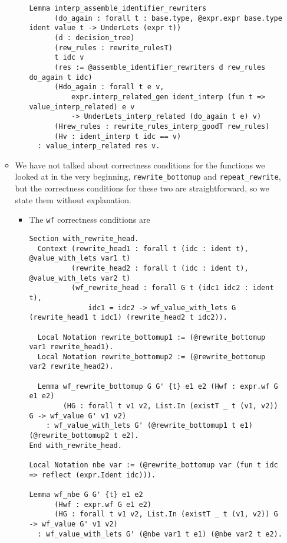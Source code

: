 \documentclass[
]{article}
\begin{document}
\begin{itemize}
\begin{itemize}
\begin{itemize}
\begin{verbatim}
Lemma interp_assemble_identifier_rewriters
      (do_again : forall t : base.type, @expr.expr base.type ident value t -> UnderLets (expr t))
      (d : decision_tree)
      (rew_rules : rewrite_rulesT)
      t idc v
      (res := @assemble_identifier_rewriters d rew_rules do_again t idc)
      (Hdo_again : forall t e v,
          expr.interp_related_gen ident_interp (fun t => value_interp_related) e v
          -> UnderLets_interp_related (do_again t e) v)
      (Hrew_rules : rewrite_rules_interp_goodT rew_rules)
      (Hv : ident_interp t idc == v)
  : value_interp_related res v.
\end{verbatim}
    \end{itemize}
  \item
    We have not talked about correctness conditions for the functions we
    looked at in the very beginning, \texttt{rewrite\_bottomup} and
    \texttt{repeat\_rewrite}, but the correctness conditions for these
    two are straightforward, so we state them without explanation.

    \begin{itemize}
    \item
      The \texttt{wf} correctness conditions are

\begin{verbatim}
Section with_rewrite_head.
  Context (rewrite_head1 : forall t (idc : ident t), @value_with_lets var1 t)
          (rewrite_head2 : forall t (idc : ident t), @value_with_lets var2 t)
          (wf_rewrite_head : forall G t (idc1 idc2 : ident t),
              idc1 = idc2 -> wf_value_with_lets G (rewrite_head1 t idc1) (rewrite_head2 t idc2)).

  Local Notation rewrite_bottomup1 := (@rewrite_bottomup var1 rewrite_head1).
  Local Notation rewrite_bottomup2 := (@rewrite_bottomup var2 rewrite_head2).

  Lemma wf_rewrite_bottomup G G' {t} e1 e2 (Hwf : expr.wf G e1 e2)
        (HG : forall t v1 v2, List.In (existT _ t (v1, v2)) G -> wf_value G' v1 v2)
    : wf_value_with_lets G' (@rewrite_bottomup1 t e1) (@rewrite_bottomup2 t e2).
End with_rewrite_head.

Local Notation nbe var := (@rewrite_bottomup var (fun t idc => reflect (expr.Ident idc))).

Lemma wf_nbe G G' {t} e1 e2
      (Hwf : expr.wf G e1 e2)
      (HG : forall t v1 v2, List.In (existT _ t (v1, v2)) G -> wf_value G' v1 v2)
  : wf_value_with_lets G' (@nbe var1 t e1) (@nbe var2 t e2).


\end{verbatim}
\end{itemize}
\end{itemize}
\end{itemize}
\end{document}
